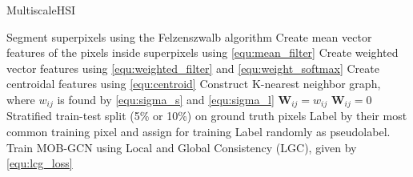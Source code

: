 
\begin{algorithm}
\caption{MultiscaleHSI}\label{alg:multiscalehsi}
\begin{algorithmic}
        \State Segment superpixels using the Felzenszwalb algorithm
        \State Create mean vector features of the pixels inside superpixels using \ref{equ:mean_filter}
        \State Create weighted vector features using \ref{equ:weighted_filter} and \ref{equ:weight_softmax}
        \State Create centroidal features using \ref{equ:centroid}
        \State Construct K-nearest neighbor graph, where $w_{ij}$ is found by \ref{equ:sigma_s} and \ref{equ:sigma_l}
        \State $\mathbf{W}_{ij} = w_{ij}$
        \Else
        \State $\mathbf{W}_{ij} = 0$
        \EndIf
        \State Stratified train-test split (5\% or 10\%) on ground truth pixels
        \State Label by their most common training pixel and assign for training
        \Else 
        \State Label randomly as pseudolabel.
        \EndIf
        \State Train MOB-GCN using Local and Global Consistency (LGC), given by \ref{equ:lcg_loss}
    \EndProcedure
\end{algorithmic}
\end{algorithm}

